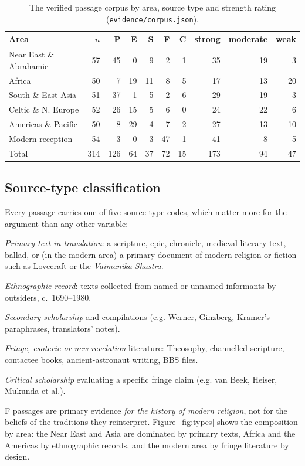 \documentclass[11pt,a4paper]{article}
\begin{document}
\begin{table}[ht]
\centering\small
\caption{The verified passage corpus by area, source type and strength rating (\texttt{evidence/corpus.json}).}\label{tab:corpus}
\begin{tabular}{@{}lrrrrrrrrr@{}}
\toprule
Area & $n$ & P & E & S & F & C & strong & moderate & weak \\
\midrule
Near East \& Abrahamic & 57 & 45 & 0 & 9 & 2 & 1 & 35 & 19 & 3 \\
Africa & 50 & 7 & 19 & 11 & 8 & 5 & 17 & 13 & 20 \\
South \& East Asia & 51 & 37 & 1 & 5 & 2 & 6 & 29 & 19 & 3 \\
Celtic \& N. Europe & 52 & 26 & 15 & 5 & 6 & 0 & 24 & 22 & 6 \\
Americas \& Pacific & 50 & 8 & 29 & 4 & 7 & 2 & 27 & 13 & 10 \\
Modern reception & 54 & 3 & 0 & 3 & 47 & 1 & 41 & 8 & 5 \\
\midrule
Total & 314 & 126 & 64 & 37 & 72 & 15 & 173 & 94 & 47 \\
\bottomrule
\end{tabular}
\end{table}

\subsection{Source-type classification}

Every passage carries one of five source-type codes, which matter more for the argument than any other variable:
\begin{description}[leftmargin=1.5em]
\item[P] \emph{Primary text in translation}: a scripture, epic, chronicle, medieval literary text, ballad, or (in the modern area) a primary document of modern religion or fiction such as Lovecraft or the \emph{Vaimanika Shastra}.
\item[E] \emph{Ethnographic record}: texts collected from named or unnamed informants by outsiders, c.~1690--1980.
\item[S] \emph{Secondary scholarship} and compilations (e.g. Werner, Ginzberg, Kramer's paraphrases, translators' notes).
\item[F] \emph{Fringe, esoteric or new-revelation} literature: Theosophy, channelled scripture, contactee books, ancient-astronaut writing, BBS files.
\item[C] \emph{Critical scholarship} evaluating a specific fringe claim (e.g. van Beek, Heiser, Mukunda et al.).
\end{description}
F passages are primary evidence \emph{for the history of modern religion}, not for the beliefs of the traditions they reinterpret. Figure~\ref{fig:types} shows the composition by area: the Near East and Asia are dominated by primary texts, Africa and the Americas by ethnographic records, and the modern area by fringe literature by design.
\end{document}
